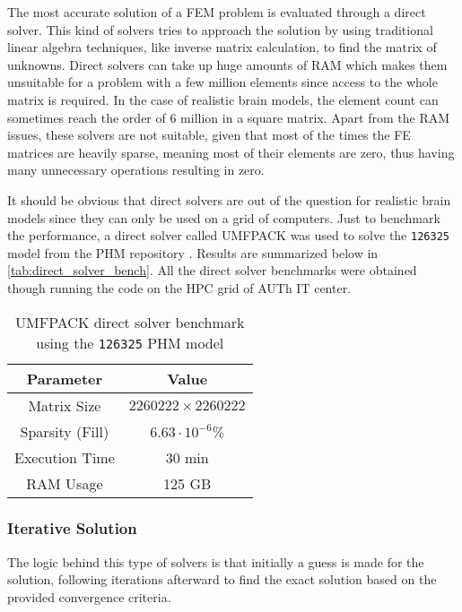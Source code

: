 The most accurate solution of a \gls{FEM} problem is evaluated through a direct solver. This kind of solvers tries to approach the solution by using traditional linear algebra techniques, like inverse matrix calculation, to find the matrix of unknowns. Direct solvers can take up huge amounts of \gls{RAM} which makes them unsuitable for a problem with a few million elements since access to the whole matrix is required. In the case of realistic brain models, the element count can sometimes reach the order of 6 million in a square matrix. Apart from the \gls{RAM} issues, these solvers are not suitable, given that most of the times the \gls{FE} matrices are heavily sparse, meaning most of their elements are zero, thus having many unnecessary operations resulting in zero.

It should be obvious that direct solvers are out of the question for realistic brain models since they can only be used on a grid of computers. Just to benchmark the performance, a direct solver called \gls{UMFPACK} \cite{Davis2004_umfpack} was used to solve the \texttt{126325} model from the \gls{PHM} repository \cite{ErikG.Lee2016}. Results are summarized below in \autoref{tab:direct_solver_bench}. All the direct solver benchmarks were obtained though running the code on the \gls{HPC} grid of \gls{AUTh} \gls{IT} center.

\begin{table}[!ht]
	\centering
	\caption{\gls{UMFPACK} direct solver benchmark using the \texttt{126325} \gls{PHM} model}
	\label{tab:direct_solver_bench}
	\begin{tabular}{|c|c|}
		\hline
		\rowcolor[HTML]{C0C0C0} 
		\textbf{Parameter} & \textbf{Value} \\ \hline
		Matrix Size & $2260222\times 2260222$ \\ \hline
		Sparsity (Fill) & $6.63\cdot 10^{-6}\%$ \\ \hline
		Execution Time & 30 min \\ \hline
		RAM Usage & 125 GB \\ \hline
	\end{tabular}
\end{table}

\subsubsection{Iterative Solution}
\label{subsec:iterative_solvers}

The logic behind this type of solvers is that initially a guess is made for the solution, following iterations afterward to find the exact solution based on the provided convergence criteria.

